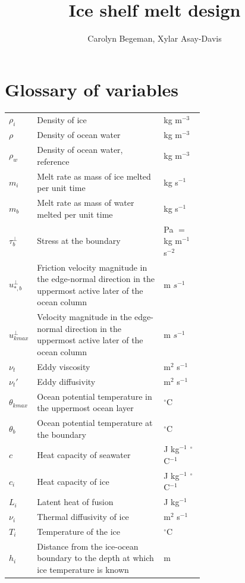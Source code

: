 \documentclass[11pt]{report}
\begin{document}
\title{Ice shelf melt design}
\author{Carolyn Begeman, Xylar Asay-Davis}

\maketitle

\section{Glossary of variables}

\begin{tabularx}{\linewidth}{l|p{0.65\linewidth}|X}
    $\rho_i$ & Density of ice & kg m$^{-3}$ \\
    $\rho$ & Density of ocean water & kg m$^{-3}$\\
    $\rho_w$ & Density of ocean water, reference & kg m$^{-3}$\\
    $m_i$ & Melt rate as mass of ice melted per unit time & kg s$^{-1}$\\
    $m_b$ & Melt rate as mass of water melted per unit time & kg s$^{-1}$\\
    $\tau_b^\perp$ & Stress at the boundary & Pa $=$ kg m$^{-1}$ s$^{-2}$\\
    $u_{*,b}^\perp$ & Friction velocity magnitude in the edge-normal direction in the uppermost active later of the ocean column & m $s^{-1}$\\
    $u_{kmax}^\perp$ & Velocity magnitude in the edge-normal direction in the uppermost active later of the ocean column & m $s^{-1}$\\
    $\nu_t$ & Eddy viscosity & m$^2$ s$^{-1}$\\
    $\nu_t'$ & Eddy diffusivity & m$^2$ s$^{-1}$\\
    $\theta_{kmax}$ & Ocean potential temperature in the uppermost ocean layer & $^\circ$C\\
    $\theta_b$ & Ocean potential temperature at the boundary & $^\circ$C\\
    $c$ & Heat capacity of seawater & J kg$^{-1}$ $^\circ$C$^{-1}$\\
    $c_i$ & Heat capacity of ice & J kg$^{-1}$ $^\circ$C$^{-1}$\\
    $L_i$ & Latent heat of fusion & J kg$^{-1}$\\
    $\nu_i$ & Thermal diffusivity of ice & m$^2$ s$^{-1}$\\
    $T_i$ & Temperature of the ice & $^{\circ}$C\\
    $h_i$ & Distance from the ice-ocean boundary to the depth at which ice temperature is known & m \\

\end{tabularx}
\end{document}
